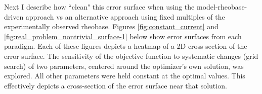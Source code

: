 Next I describe how ``clean" this error surface when using the model-rheobase-driven approach vs an alternative approach using fixed multiples of the experimentally observed rheobase.
Figures \ref{fig:constant_current} and \ref{fig:real_problem_nontrivial_surface-1} below show error surfaces from each paradigm.
Each of these figures depicts a heatmap of a 2D cross-section of the error surface.
The sensitivity of the objective function to systematic changes (grid search) of two parameters, centered around the optimizer's own solution, was explored.
All other parameters were held constant at the optimal values.
This effectively depicts a cross-section of the error surface near that solution.



